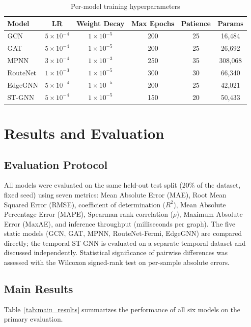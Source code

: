 \documentclass[12pt]{article}
\begin{document}
\begin{table}[h]
\centering
\caption{Per-model training hyperparameters}
\begin{tabular}{lccccc}
\toprule
\textbf{Model} & \textbf{LR} & \textbf{Weight Decay} & \textbf{Max Epochs} & \textbf{Patience} & \textbf{Params} \\
\midrule
GCN          & $5\times10^{-4}$ & $1\times10^{-5}$ & 200 & 25 & 16,484 \\
GAT          & $5\times10^{-4}$ & $1\times10^{-5}$ & 200 & 25 & 26,692 \\
MPNN         & $3\times10^{-4}$ & $1\times10^{-3}$ & 250 & 35 & 308,068 \\
RouteNet     & $1\times10^{-3}$ & $1\times10^{-5}$ & 300 & 30 & 66,340 \\
EdgeGNN      & $5\times10^{-4}$ & $1\times10^{-5}$ & 200 & 25 & 42,021 \\
ST-GNN       & $5\times10^{-4}$ & $1\times10^{-5}$ & 150 & 20 & 50,433 \\
\bottomrule
\end{tabular}
\end{table}

\section{Results and Evaluation}
\label{sec:results}

\subsection{Evaluation Protocol}
All models were evaluated on the same held-out test split (20\% of the dataset, fixed seed) using seven metrics: Mean Absolute Error (MAE), Root Mean Squared Error (RMSE), coefficient of determination ($R^2$), Mean Absolute Percentage Error (MAPE), Spearman rank correlation ($\rho$), Maximum Absolute Error (MaxAE), and inference throughput (milliseconds per graph). The five static models (GCN, GAT, MPNN, RouteNet-Fermi, EdgeGNN) are compared directly; the temporal ST-GNN is evaluated on a separate temporal dataset and discussed independently. Statistical significance of pairwise differences was assessed with the Wilcoxon signed-rank test on per-sample absolute errors.

\subsection{Main Results}
Table~\ref{tab:main_results} summarizes the performance of all six models on the primary evaluation.
\end{document}
